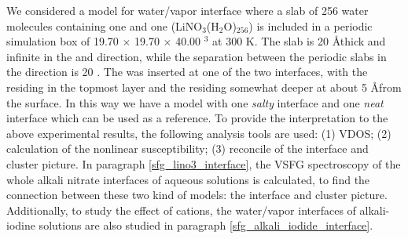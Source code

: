 We considered a model for water/vapor interface where a slab of 256 water molecules containing one \Li and 
one \nitrate (LiNO$_3$(H$_2$O)$_{256}$) is included in a periodic simulation box of 19.70 $\times $ 19.70 $\times $ 40.00 \A$^3$ at 300 K.
The slab is 20 \AA thick and infinite in the \X and \Y direction, while the
separation between the periodic slabs in the \Z direction is 20 \A.
The  \LiN was inserted at one of the two interfaces, with the \nitrate residing in the topmost layer and 
the \Li residing somewhat deeper at about 5 \AA from the surface. In this way we have a model with one \emph{salty} interface
and one \emph{neat} interface which can be used as a reference.  
To provide the interpretation to the above experimental results, the following analysis tools are used:
(1) VDOS; 
(2) calculation of the nonlinear susceptibility; 
(3) reconcile of the interface and cluster picture.
In paragraph \ref{sfg_lino3_interface}, the VSFG spectroscopy of the whole alkali nitrate interfaces of  aqueous solutions is calculated,
to find the connection between these two kind of models: the interface and cluster picture.
Additionally, to study the effect of cations, the water/vapor interfaces of alkali-iodine solutions are also studied in paragraph \ref{sfg_alkali_iodide_interface}.


